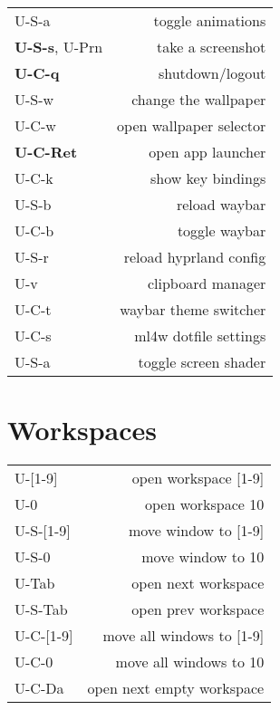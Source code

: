 \documentclass[
  ,landscape
  ,columns=4
]{cheatsheet}
\begin{document}
\begin{tabular}{lr}
  U-S-a & toggle animations \\
  \textbf{U-S-s}, U-Prn & take a screenshot \\
  \textbf{U-C-q} & shutdown/logout \\
  U-S-w & change the wallpaper \\
  U-C-w & open wallpaper selector \\
  \textbf{U-C-Ret} & open app launcher \\
  U-C-k & show key bindings \\
  U-S-b & reload waybar \\
  U-C-b & toggle waybar \\
  U-S-r & reload hyprland config \\
  U-v & clipboard manager \\
  U-C-t & waybar theme switcher \\
  U-C-s & ml4w dotfile settings \\
  U-S-a & toggle screen shader \\

\end{tabular}

\section{Workspaces}

\begin{tabular}{lr}
  U-[1-9] & open workspace [1-9] \\
  U-0 & open workspace 10 \\
  U-S-[1-9] & move window to [1-9] \\
  U-S-0 & move window to 10 \\
  U-Tab & open next workspace \\
  U-S-Tab & open prev workspace \\
  U-C-[1-9] & move all windows to [1-9] \\
  U-C-0 & move all windows to 10 \\
  U-C-Da & open next empty workspace \\
\end{tabular}
\end{document}
